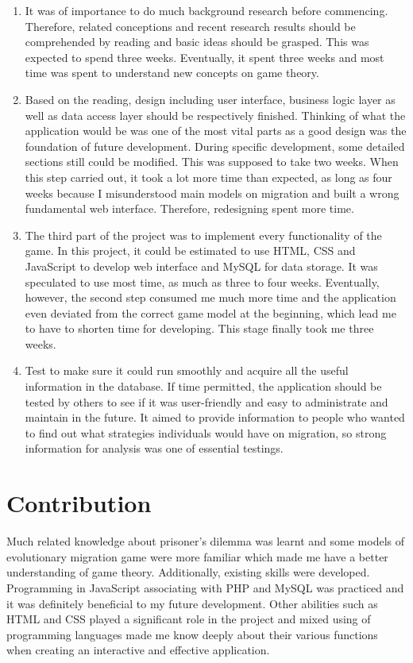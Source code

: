 \begin{enumerate}
\item It was of importance to do much background research before commencing. Therefore, related conceptions and recent research results should be comprehended by reading and basic ideas should be grasped. This was expected to spend  three weeks. Eventually, it spent three weeks and most time was spent to understand new concepts on game theory.
\item Based on the reading, design including user interface, business logic layer as well as data access layer should be respectively finished. Thinking of what the application would be was one of the most vital parts as a good design was the foundation of future development. During specific development, some detailed sections still could be modified. This was supposed to take two weeks. When this step carried out, it took a lot more time than expected, as long as four weeks because I misunderstood main models on migration and built a wrong fundamental web interface. Therefore, redesigning spent more time.
\item The third part of the project was to implement every functionality of the game. In this project, it could be estimated to use HTML, CSS and JavaScript to develop web interface and MySQL for data storage. It was speculated to use most time, as much as three to four weeks. Eventually, however, the second step consumed me much more time and the application even deviated from the correct game model at the beginning, which lead me to have to shorten time for developing. This stage finally took me three weeks.
\item Test to make sure it could run smoothly and acquire all the useful information in the database. If time permitted, the application should be tested by others to see if it was user-friendly and easy to administrate and maintain in the future. It aimed to provide information to people who wanted to find out what strategies individuals would have on migration, so strong information for analysis was one of essential testings.
\end{enumerate}

\section{Contribution}
Much related knowledge about prisoner's dilemma was learnt and some models of evolutionary migration game were more familiar which made me have a better understanding of game theory. Additionally, existing skills were developed. Programming in JavaScript associating with PHP and MySQL was practiced and it was definitely beneficial to my future development. Other abilities such as HTML and CSS played a significant role in the project and mixed using of programming languages made me know deeply about their various functions when creating an interactive and effective application.
